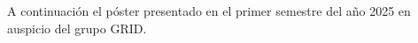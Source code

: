 A continuación el póster presentado en el primer semestre del año 2025 en auspicio del grupo GRID.


